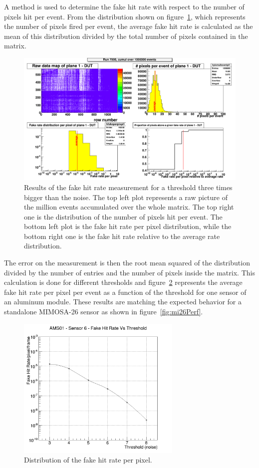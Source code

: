   A method is used to determine the fake hit rate with respect to the number of pixels hit per event.
  From the distribution shown on figure~\ref{fig:pixel/event}, which represents the number of pixels fired per event, the average fake hit rate is calculated as the mean of this distribution divided by the total number of pixels contained in the matrix.
    \begin{figure}
    \centering
    \includegraphics[width = \textwidth]{Pictures/labTests/FHR_AS01_chip3.png}
    \caption{Results of the fake hit rate measurement for a threshold three times bigger than the noise. The top left plot represents a raw picture of the million events accumulated over the whole matrix. The top right one is the distribution of the number of pixels hit per event. The bottom left plot is the fake hit rate per pixel distribution, while the bottom right one is the fake hit rate relative to the average rate distribution.}
    \label{fig:pixel/event}
  \end{figure}
  The error on the measurement is then the root mean squared of the distribution divided by the number of entries and the number of pixels inside the matrix.
  This calculation is done for different thresholds and figure~\ref{fig:FHR} represents the average fake hit rate per pixel per event as a function of the threshold for one sensor of an aluminum module.
  These results are matching the expected behavior for a standalone \gls{MIMOSA}-26 sensor as shown in figure~\ref{fig:mi26Perf}.

  \begin{figure}
    \centering
    \includegraphics[width=0.7\textwidth]{Pictures/labTests/fake_sensor6.png}
    \caption{Distribution of the fake hit rate per pixel.}
    \label{fig:FHR}
  \end{figure}

